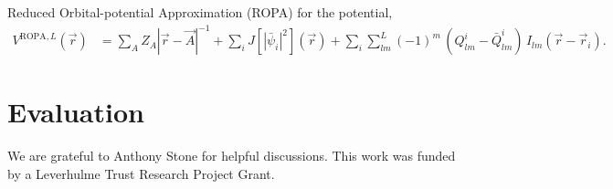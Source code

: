 \documentclass[journal=jacsat,manuscript=article]{achemso}
\begin{document}
Reduced Orbital-potential Approximation (ROPA) for the potential,
\begin{align}
    V^{\text{ROPA},L}(\vec r) &=
    \sum_A Z_A |\vec r
    - \vec A|^{-1}
    +\sum_i J\left[\left|\bar\psi_i\right|^2\right](\vec r)
    +\sum_i \sum_{lm}^L (-1)^m\,\left(Q^i_{lm}-\bar Q^i_{lm}\right)\, I_{lm}(\vec r - \vec r_i)
    .
\end{align}
\section{Evaluation}

\begin{acknowledgement}

We are grateful to Anthony Stone for helpful discussions.
This work was funded by a Leverhulme Trust Research Project Grant.

\end{acknowledgement}





\end{document}
